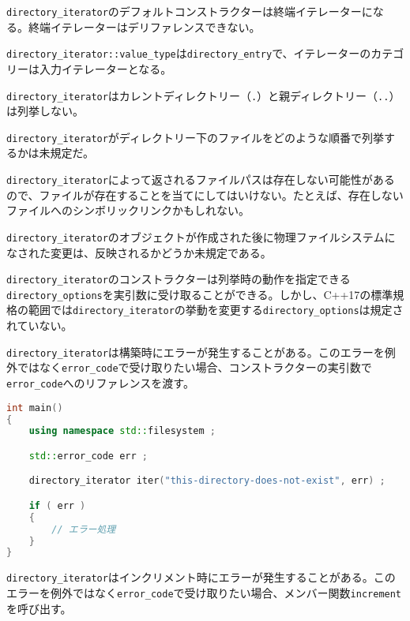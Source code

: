 \lstinline!directory_iterator!のデフォルトコンストラクターは終端イテレーターになる。終端イテレーターはデリファレンスできない。

\lstinline!directory_iterator::value_type!は\lstinline!directory_entry!で、イテレーターのカテゴリーは入力イテレーターとなる。

\lstinline!directory_iterator!はカレントディレクトリー（\lstinline!.!）と親ディレクトリー（\lstinline!..!）は列挙しない。

\lstinline!directory_iterator!がディレクトリー下のファイルをどのような順番で列挙するかは未規定だ。

\lstinline!directory_iterator!によって返されるファイルパスは存在しない可能性があるので、ファイルが存在することを当てにしてはいけない。たとえば、存在しないファイルへのシンボリックリンクかもしれない。

\lstinline!directory_iterator!のオブジェクトが作成された後に物理ファイルシステムになされた変更は、反映されるかどうか未規定である。

\lstinline!directory_iterator!のコンストラクターは列挙時の動作を指定できる\lstinline!directory_options!を実引数に受け取ることができる。しかし、C++17の標準規格の範囲では\lstinline!directory_iterator!の挙動を変更する\lstinline!directory_options!は規定されていない。

%

\lstinline!directory_iterator!は構築時にエラーが発生することがある。このエラーを例外ではなく\lstinline!error_code!で受け取りたい場合、コンストラクターの実引数で\lstinline!error_code!へのリファレンスを渡す。

\begin{lstlisting}[language=C++]
int main()
{
    using namespace std::filesystem ;

    std::error_code err ;

    directory_iterator iter("this-directory-does-not-exist", err) ;

    if ( err )
    {
        // エラー処理
    }
}
\end{lstlisting}

\lstinline!directory_iterator!はインクリメント時にエラーが発生することがある。このエラーを例外ではなく\lstinline!error_code!で受け取りたい場合、メンバー関数\lstinline!increment!を呼び出す。

